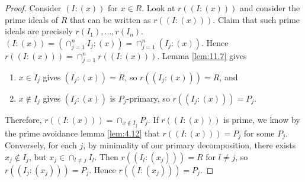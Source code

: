 \documentclass{article}
\newcommand{\rb}[1]{\left( #1 \right)}
\theoremstyle{definition}\newtheorem{definition}{Definition}[section]
\theoremstyle{definition}\newtheorem{remark}[definition]{Remark}
\theoremstyle{definition}\newtheorem*{example}{Example}
\theoremstyle{definition}\newtheorem*{note}{Note}
\begin{document}
\begin{proof}
Consider $ \rb{I : \rb{x}} $ for $ x \in R $. Look at $ r\rb{\rb{I : \rb{x}}} $ and consider the prime ideals of $ R $ that can be written as $ r\rb{\rb{I : \rb{x}}} $. Claim that such prime ideals are precisely $ r\rb{I_1}, \dots, r\rb{I_n} $. $ \rb{I : \rb{x}} = \rb{\cap_{j = 1}^n I_j : \rb{x}} = \cap_{j = 1}^n \rb{I_j : \rb{x}} $. Hence $ r\rb{\rb{I : \rb{x}}} = \cap_{j = 1}^n r\rb{\rb{I : \rb{x}}} $. Lemma \ref{lem:11.7} gives
\begin{enumerate}
\item $ x \in I_j $ gives $ \rb{I_j : \rb{x}} = R $, so $ r\rb{\rb{I_j : \rb{x}}} = R $, and
\item $ x \notin I_j $ gives $ \rb{I_j : \rb{x}} $ is $ P_j $-primary, so $ r\rb{\rb{I_j : \rb{x}}} = P_j $.
\end{enumerate}
Therefore, $ r\rb{\rb{I : \rb{x}}} = \cap_{x \notin I_j} P_j $. If $ r\rb{\rb{I : \rb{x}}} $ is prime, we know by the prime avoidance lemma \ref{lem:4.12} that $ r\rb{\rb{I : \rb{x}}} = P_j $ for some $ P_j $. Conversely, for each $ j $, by minimality of our primary decomposition, there exists $ x_j \notin I_j $, but $ x_j \in \cap_{l \ne j} I_l $. Then $ r\rb{\rb{I_l : \rb{x_j}}} = R $ for $ l \ne j $, so $ r\rb{\rb{I_j : \rb{x_j}}} = P_j $. Hence $ r\rb{\rb{I : \rb{x_j}}} = P_j $.
\end{proof}
\end{document}
